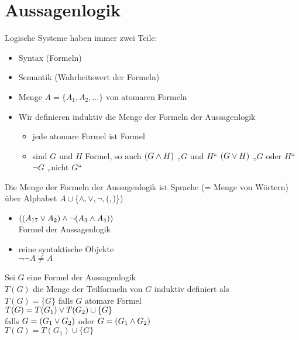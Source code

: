 
\section{Aussagenlogik}

Logische Systeme haben immer zwei Teile:
\begin{itemize}
\item Syntax (Formeln)
\item Semantik (Wahrheitswert der Formeln)
\end{itemize}

\begin{itemize}
\item Menge $A = \{ A_1, A_2, ... \}$ von atomaren Formeln
\item Wir definieren induktiv die Menge der Formeln der Aussagenlogik
    \begin{itemize}
        \item jede atomare Formel ist Formel
        \item sind $G$ und $H$ Formel, so auch $( G \wedge H )$ „$G$ und $H$“ $(G \vee H)$ „$G$ oder $H$“ $\neg G$ „nicht $G$“
    \end{itemize}
\end{itemize}

\beweis{}
Die Menge der Formeln der Aussagenlogik ist Sprache (= Menge von Wörtern) über Alphabet $A \cup \{\wedge, \vee, \neg, (, ) \})$\\

\beispiel{}
\begin{itemize}
\item $ \left( ( A_{17} \vee A_2 ) \wedge \neg (A_3 \wedge A_4) \right)$\\
    Formel der Aussagenlogik
\item reine syntaktische Objekte\\
    $\neg \neg A \neq A$
\end{itemize}

\beweis{}
Sei $G$ eine Formel der Aussagenlogik\\
$T(G)$ die Menge der Teilformeln von $G$ induktiv definiert als\\
$T(G) = \{ G \}$ falls $G$ atomare Formel\\
$T(G) = T(G_1) \vee T(G_2) \cup \{G\}$\\
falls $G = (G_1 \vee G_2)$ oder $G=(G_1 \wedge G_2)$\\
$T(G)=T(G_1) \cup \{G\}$\\


